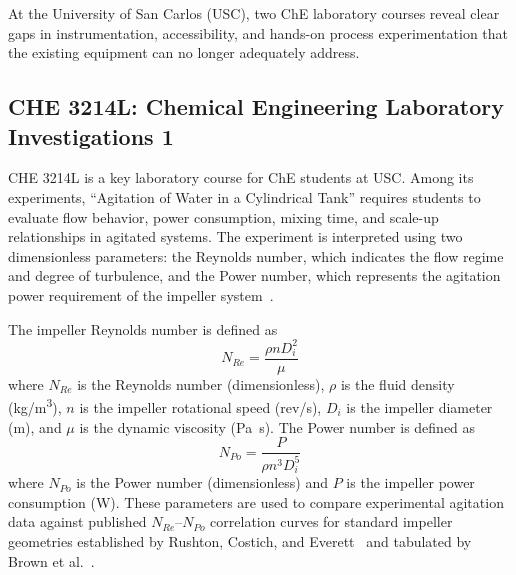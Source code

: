 At the University of San Carlos (USC), two ChE laboratory courses reveal clear gaps in instrumentation, accessibility, and hands-on process experimentation that the existing equipment can no longer adequately address.

\subsection{CHE 3214L: Chemical Engineering Laboratory Investigations 1} %
\label{subsec:che3214l}

CHE 3214L is a key laboratory course for ChE students at USC. Among its experiments, ``Agitation of Water in a Cylindrical Tank'' requires students to evaluate flow behavior, power consumption, mixing time, and scale-up relationships in agitated systems. The experiment is interpreted using two dimensionless parameters: the Reynolds number, which indicates the flow regime and degree of turbulence, and the Power number, which represents the agitation power requirement of the impeller system~\citep{rushton1950}.

The impeller Reynolds number is defined as
\begin{equation}
N_{Re} = \frac{\rho n D_i^2}{\mu}
\label{eq:reynolds}
\end{equation}
where $N_{Re}$ is the Reynolds number (dimensionless), $\rho$ is the fluid density (\si{kg/m^3}), $n$ is the impeller rotational speed (rev/s), $D_i$ is the impeller diameter (m), and $\mu$ is the dynamic viscosity (\si{Pa.s}). 
The Power number is defined as
\begin{equation}
N_{Po} = \frac{P}{\rho n^3 D_i^5}
\label{eq:power}
\end{equation}
where $N_{Po}$ is the Power number (dimensionless) and $P$ is the impeller power consumption (W). These parameters are used to compare experimental agitation data against published $N_{Re}$--$N_{Po}$ correlation curves for standard impeller geometries established by Rushton, Costich, and Everett~\citep{rushton1950} and tabulated by Brown et al.~\citep{brown1950}.


